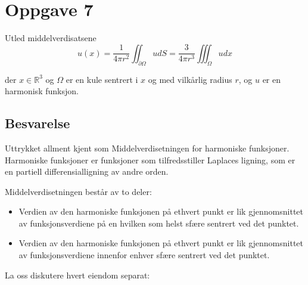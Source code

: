 \section{Oppgave 7}
Utled middelverdisatsene
\begin{equation*}
u(x)=\frac{1}{4 \pi r^{2}} \iint_{\partial \Omega} u d S=\frac{3}{4 \pi r^{3}} \iiint_{\Omega} u d x
\end{equation*}

der $ x \in \mathbb{R}^{3} $ og $ \Omega $ er en kule sentrert i $ x $ og med vilkårlig radius $r $, og $ u $ er en harmonisk funksjon.

\subsection*{Besvarelse}

Uttrykket allment kjent som Middelverdisetningen for harmoniske funksjoner. Harmoniske funksjoner er funksjoner som tilfredsstiller Laplaces ligning, som er en partiell differensialligning av andre orden.

Middelverdisetningen består av to deler:
\begin{itemize}
    \item Verdien av den harmoniske funksjonen på ethvert punkt er lik gjennomsnittet av funksjonsverdiene på en hvilken som helst sfære sentrert ved det punktet.
    \item Verdien av den harmoniske funksjonen på ethvert punkt er lik gjennomsnittet av funksjonsverdiene innenfor enhver sfære sentrert ved det punktet.
    
\end{itemize}

La oss diskutere hvert eiendom separat:

